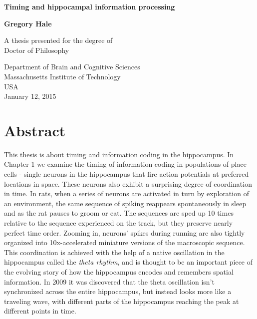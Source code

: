 \documentclass[]{article}
\date{}
\let\stdsection\section
\renewcommand\section{\newpage\stdsection}
\begin{document}
\setcounter{page}{1}
    \begin{center}
        \vspace*{1cm}
        
        \Huge
        \textbf{Timing and hippocampal information processing}
        
        \vspace{0.5cm}
        \LARGE
        
        
        \vspace{1.5cm}
        
        \textbf{Gregory Hale}
        
        \vfill
        
        A thesis presented for the degree of\\
        Doctor of Philosophy
        
        \vspace{0.8cm}
        

        
        \Large
        Department of Brain and Cognitive Sciences\\
        Massachusetts Institute of Technology\\
        USA\\
        January 12, 2015
        
    \end{center}
\newpage

{
\hypersetup{linkcolor=black}
\setcounter{tocdepth}{3}
\tableofcontents
}
\section{Abstract}

This thesis is about timing and information coding in the hippocampus.
In Chapter 1 we examine the timing of information coding in populations
of place cells - single neurons in the hippocampus that fire action
potentials at preferred locations in space. These neurons also exhibit a
surprising degree of coordination in time. In rats, when a series of
neurons are activated in turn by exploration of an environment, the same
sequence of spiking reappears spontaneously in sleep and as the rat
pauses to groom or eat. The sequences are sped up 10 times relative to
the sequence experienced on the track, but they preserve nearly perfect
time order. Zooming in, neurons' spikes during running are also tightly
organized into 10x-accelerated miniature versions of the macroscopic
sequence. This coordination is achieved with the help of a native
oscillation in the hippocampus called the \emph{theta rhythm}, and is
thought to be an important piece of the evolving story of how the
hippocampus encodes and remembers spatial information. In 2009 it was
discovered that the theta oscillation isn't synchronized across the
entire hippocampus, but instead looks more like a traveling wave, with
different parts of the hippocampus reaching the peak at different points
in time.
\end{document}
